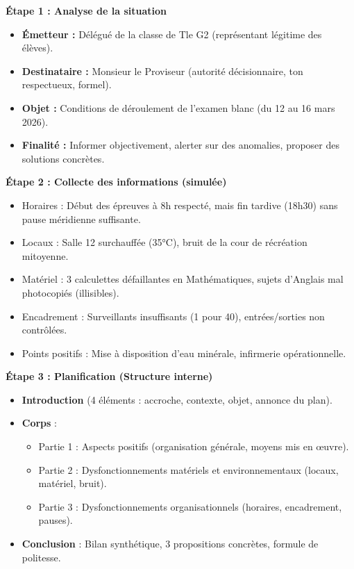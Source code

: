 \documentclass[11pt]{article}
\begin{document}
\begin{exoresolu}
\textbf{Étape 1 : Analyse de la situation}
\begin{itemize}
    \item \textbf{Émetteur :} Délégué de la classe de Tle G2 (représentant légitime des élèves).
    \item \textbf{Destinataire :} Monsieur le Proviseur (autorité décisionnaire, ton respectueux, formel).
    \item \textbf{Objet :} Conditions de déroulement de l'examen blanc (du 12 au 16 mars 2026).
    \item \textbf{Finalité :} Informer objectivement, alerter sur des anomalies, proposer des solutions concrètes.
\end{itemize}

\textbf{Étape 2 : Collecte des informations (simulée)}
\begin{itemize}
    \item Horaires : Début des épreuves à 8h respecté, mais fin tardive (18h30) sans pause méridienne suffisante.
    \item Locaux : Salle 12 surchauffée (35°C), bruit de la cour de récréation mitoyenne.
    \item Matériel : 3 calculettes défaillantes en Mathématiques, sujets d'Anglais mal photocopiés (illisibles).
    \item Encadrement : Surveillants insuffisants (1 pour 40), entrées/sorties non contrôlées.
    \item Points positifs : Mise à disposition d'eau minérale, infirmerie opérationnelle.
\end{itemize}

\textbf{Étape 3 : Planification (Structure interne)}
\begin{itemize}
    \item \textbf{Introduction} (4 éléments : accroche, contexte, objet, annonce du plan).
    \item \textbf{Corps} :
        \begin{itemize}
            \item Partie 1 : Aspects positifs (organisation générale, moyens mis en œuvre).
            \item Partie 2 : Dysfonctionnements matériels et environnementaux (locaux, matériel, bruit).
            \item Partie 3 : Dysfonctionnements organisationnels (horaires, encadrement, pauses).
        \end{itemize}
    \item \textbf{Conclusion} : Bilan synthétique, 3 propositions concrètes, formule de politesse.
\end{itemize}


\end{exoresolu}
\end{document}
